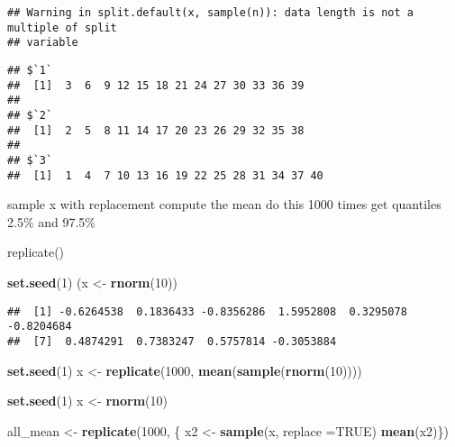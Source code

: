 \documentclass[]{article}
\newenvironment{Shaded}{\begin{snugshade}}{\end{snugshade}}
\newcommand{\DataTypeTok}[1]{\textcolor[rgb]{0.13,0.29,0.53}{#1}}
\newcommand{\DecValTok}[1]{\textcolor[rgb]{0.00,0.00,0.81}{#1}}
\newcommand{\KeywordTok}[1]{\textcolor[rgb]{0.13,0.29,0.53}{\textbf{#1}}}
\newcommand{\NormalTok}[1]{#1}
\newcommand{\OtherTok}[1]{\textcolor[rgb]{0.56,0.35,0.01}{#1}}
\newcommand{\StringTok}[1]{\textcolor[rgb]{0.31,0.60,0.02}{#1}}
\begin{document}
\begin{verbatim}
## Warning in split.default(x, sample(n)): data length is not a multiple of split
## variable
\end{verbatim}

\begin{verbatim}
## $`1`
##  [1]  3  6  9 12 15 18 21 24 27 30 33 36 39
## 
## $`2`
##  [1]  2  5  8 11 14 17 20 23 26 29 32 35 38
## 
## $`3`
##  [1]  1  4  7 10 13 16 19 22 25 28 31 34 37 40
\end{verbatim}

sample x with replacement compute the mean do this 1000 times get
quantiles 2.5\% and 97.5\%

replicate()

\begin{Shaded}
\begin{Highlighting}[]
\KeywordTok{set.seed}\NormalTok{(}\DecValTok{1}\NormalTok{)}
\NormalTok{(x <-}\StringTok{ }\KeywordTok{rnorm}\NormalTok{(}\DecValTok{10}\NormalTok{))}
\end{Highlighting}
\end{Shaded}

\begin{verbatim}
##  [1] -0.6264538  0.1836433 -0.8356286  1.5952808  0.3295078 -0.8204684
##  [7]  0.4874291  0.7383247  0.5757814 -0.3053884
\end{verbatim}

\begin{Shaded}
\begin{Highlighting}[]
\KeywordTok{set.seed}\NormalTok{(}\DecValTok{1}\NormalTok{)}
\NormalTok{x <-}\StringTok{ }\KeywordTok{replicate}\NormalTok{(}\DecValTok{1000}\NormalTok{, }\KeywordTok{mean}\NormalTok{(}\KeywordTok{sample}\NormalTok{(}\KeywordTok{rnorm}\NormalTok{(}\DecValTok{10}\NormalTok{))))}
\end{Highlighting}
\end{Shaded}

\begin{Shaded}
\begin{Highlighting}[]
\KeywordTok{set.seed}\NormalTok{(}\DecValTok{1}\NormalTok{)}
\NormalTok{x <-}\StringTok{ }\KeywordTok{rnorm}\NormalTok{(}\DecValTok{10}\NormalTok{)}

\NormalTok{all_mean <-}\StringTok{ }\KeywordTok{replicate}\NormalTok{(}\DecValTok{1000}\NormalTok{, \{}
\NormalTok{          x2 <-}\StringTok{ }\KeywordTok{sample}\NormalTok{(x, }\DataTypeTok{replace =}\OtherTok{TRUE}\NormalTok{)}
          \KeywordTok{mean}\NormalTok{(x2)\})}
\end{Highlighting}
\end{Shaded}
\end{document}
